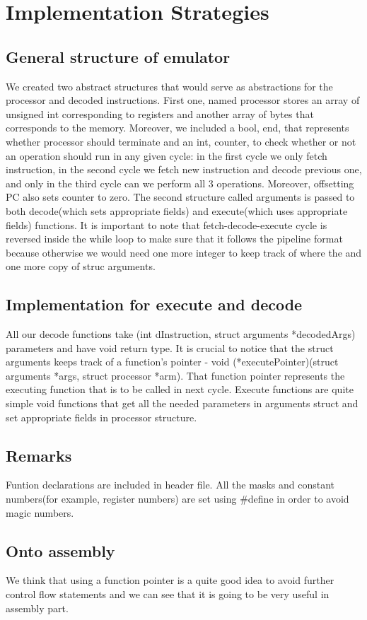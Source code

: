 \documentclass[11pt]{article}
\begin{document}
	


\section{Implementation Strategies}
	\subsection{General structure of emulator}
	We created two abstract structures that would serve as abstractions for the processor and decoded instructions. First one, named processor stores an array of unsigned int  corresponding to registers and another array of bytes that corresponds to the memory. Moreover, we included a bool, end, that represents whether processor should terminate and an int, counter, to check whether or not an operation should run in any given cycle: in the first cycle we only fetch instruction, in the second cycle we fetch new instruction and decode previous one, and only in the third cycle can we perform all 3 operations. Moreover, offsetting PC also sets counter to zero. The second structure called arguments is passed to both decode(which sets appropriate fields) and execute(which uses appropriate fields) functions. It is important to note that fetch-decode-execute cycle is reversed inside the while loop to make sure that it follows the pipeline format because otherwise we would need one more integer to keep track of where the and one more copy of struc arguments.  
	 \subsection{Implementation for execute and decode}
	 All our decode functions take (int dInstruction, struct arguments *decodedArgs) parameters and have void return type. It is crucial to notice that the struct arguments  keeps track of a function's pointer - void (*executePointer)(struct arguments *args, struct processor *arm). That function pointer represents the executing function that is to be called in next cycle. Execute functions are quite simple void functions that get all the needed parameters in arguments struct and set appropriate fields in processor structure.
	\subsection{Remarks}
	Funtion declarations are included in header file. All the masks and constant numbers(for example, register numbers) are set using #define in order to avoid magic numbers. 
	\subsection{Onto assembly}
	We think that using a function pointer is a quite good idea to avoid further control flow statements and we can see that it is going to be very useful in assembly part.
\end{document}
